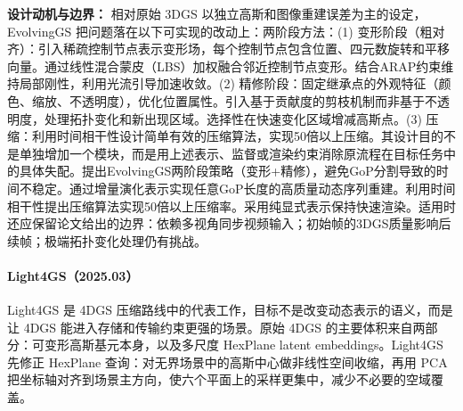 \textbf{设计动机与边界：} 相对原始 3DGS 以独立高斯和图像重建误差为主的设定，EvolvingGS 把问题落在以下可实现的改动上：两阶段方法：(1) 变形阶段（粗对齐）：引入稀疏控制节点表示变形场，每个控制节点包含位置、四元数旋转和平移向量。通过线性混合蒙皮（LBS）加权融合邻近控制节点变形。结合ARAP约束维持局部刚性，利用光流引导加速收敛。(2) 精修阶段：固定继承点的外观特征（颜色、缩放、不透明度），优化位置属性。引入基于贡献度的剪枝机制而非基于不透明度，处理拓扑变化和新出现区域。选择性在快速变化区域增减高斯点。(3) 压缩：利用时间相干性设计简单有效的压缩算法，实现50倍以上压缩。其设计目的不是单独增加一个模块，而是用上述表示、监督或渲染约束消除原流程在目标任务中的具体失配。提出EvolvingGS两阶段策略（变形+精修），避免GoP分割导致的时间不稳定。通过增量演化表示实现任意GoP长度的高质量动态序列重建。利用时间相干性提出压缩算法实现50倍以上压缩率。采用纯显式表示保持快速渲染。适用时还应保留论文给出的边界：依赖多视角同步视频输入；初始帧的3DGS质量影响后续帧；极端拓扑变化处理仍有挑战。
\paragraph{Light4GS（2025.03）\cite{2503_13948}}
Light4GS 是 4DGS 压缩路线中的代表工作，目标不是改变动态表示的语义，而是让 4DGS 能进入存储和传输约束更强的场景。原始 4DGS 的主要体积来自两部分：可变形高斯基元本身，以及多尺度 HexPlane latent embeddings。Light4GS 先修正 HexPlane 查询：对无界场景中的高斯中心做非线性空间收缩，再用 PCA 把坐标轴对齐到场景主方向，使六个平面上的采样更集中，减少不必要的空域覆盖。

